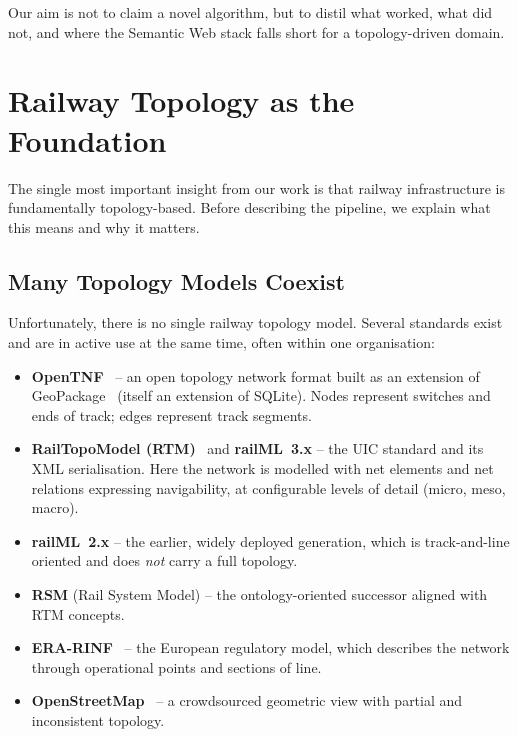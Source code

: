 \documentclass[twocolumn]{ceurart}
\begin{document}
Our aim is not to claim a novel algorithm, but to distil what worked, what did
not, and where the Semantic Web stack falls short for a topology-driven domain.

\section{Railway Topology as the Foundation}
\label{sec:topology}

The single most important insight from our work is that railway infrastructure
is fundamentally topology-based. Before describing the pipeline, we explain what
this means and why it matters.

\subsection{Many Topology Models Coexist}

Unfortunately, there is no single railway topology model. Several standards
exist and are in active use at the same time, often within one organisation:

\begin{itemize}
  \item \textbf{OpenTNF}~\cite{opentnf} -- an open topology network format built
        as an extension of GeoPackage~\cite{geopackage} (itself an extension of
        SQLite). Nodes represent switches and ends of track; edges represent
        track segments.
  \item \textbf{RailTopoModel (RTM)}~\cite{rtm} and \textbf{railML~3.x}
        \cite{railml} -- the UIC standard and its XML serialisation. Here the
        network is modelled with net elements and net relations expressing
        navigability, at configurable levels of detail (micro, meso, macro).
  \item \textbf{railML~2.x} -- the earlier, widely deployed generation, which is
        track-and-line oriented and does \emph{not} carry a full topology.
  \item \textbf{RSM} (Rail System Model) -- the ontology-oriented successor
        aligned with RTM concepts.
  \item \textbf{ERA-RINF}~\cite{eraontology,rinf} -- the European regulatory
        model, which describes the network through operational points and
        sections of line.
  \item \textbf{OpenStreetMap}~\cite{osm} -- a crowdsourced geometric view with
        partial and inconsistent topology.
\end{itemize}
\end{document}
